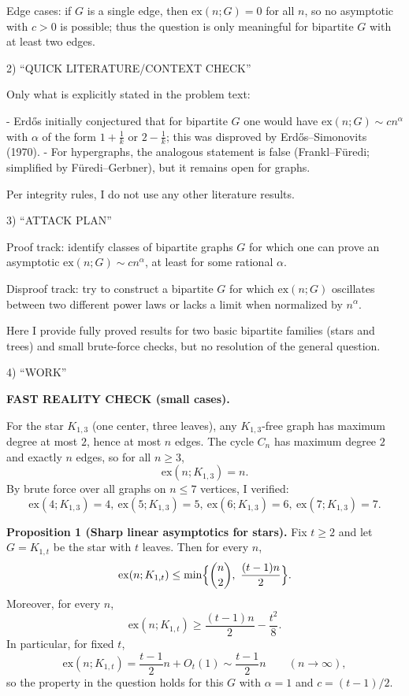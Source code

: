 Edge cases: if $G$ is a single edge, then $\mathrm{ex}(n;G)=0$ for all $n$, so no asymptotic with $c>0$ is possible; thus the question is only meaningful for bipartite $G$ with at least two edges.

2) “QUICK LITERATURE/CONTEXT CHECK”

Only what is explicitly stated in the problem text:

- Erd\H{o}s initially conjectured that for bipartite $G$ one would have $\mathrm{ex}(n;G)\sim c n^{\alpha}$ with $\alpha$ of the form $1+\frac1k$ or $2-\frac1k$; this was disproved by Erd\H{o}s--Simonovits (1970).
- For hypergraphs, the analogous statement is false (Frankl--F\"{u}redi; simplified by F\"{u}redi--Gerbner), but it remains open for graphs.

Per integrity rules, I do not use any other literature results.

3) “ATTACK PLAN”

Proof track: identify classes of bipartite graphs $G$ for which one can prove an asymptotic $\mathrm{ex}(n;G)\sim c n^{\alpha}$, at least for some rational $\alpha$.

Disproof track: try to construct a bipartite $G$ for which $\mathrm{ex}(n;G)$ oscillates between two different power laws or lacks a limit when normalized by $n^{\alpha}$.

Here I provide fully proved results for two basic bipartite families (stars and trees) and small brute-force checks, but no resolution of the general question.

4) “WORK”

\textbf{FAST REALITY CHECK (small cases).}

For the star $K_{1,3}$ (one center, three leaves), any $K_{1,3}$-free graph has maximum degree at most $2$, hence at most $n$ edges. The cycle $C_n$ has maximum degree $2$ and exactly $n$ edges, so for all $n\ge 3$,
\[
\mathrm{ex}(n;K_{1,3})=n.
\]
By brute force over all graphs on $n\le 7$ vertices, I verified:
\[
\mathrm{ex}(4;K_{1,3})=4,\ \mathrm{ex}(5;K_{1,3})=5,\ \mathrm{ex}(6;K_{1,3})=6,\ \mathrm{ex}(7;K_{1,3})=7.
\]

\medskip
\textbf{Proposition 1 (Sharp linear asymptotics for stars).}
Fix $t\ge 2$ and let $G=K_{1,t}$ be the star with $t$ leaves. Then for every $n$,
\[
\mathrm{ex}(n;K_{1,t})\le \min\Bigl\{\binom{n}{2},\ \frac{(t-1)n}{2}\Bigr\}.
\]
Moreover, for every $n$,
\[
\mathrm{ex}(n;K_{1,t})\ge \frac{(t-1)n}{2}-\frac{t^2}{8}.
\]
In particular, for fixed $t$,
\[
\mathrm{ex}(n;K_{1,t})=\frac{t-1}{2}n+O_t(1)\sim \frac{t-1}{2}n
\qquad (n\to\infty),
\]
so the property in the question holds for this $G$ with $\alpha=1$ and $c=(t-1)/2$.

